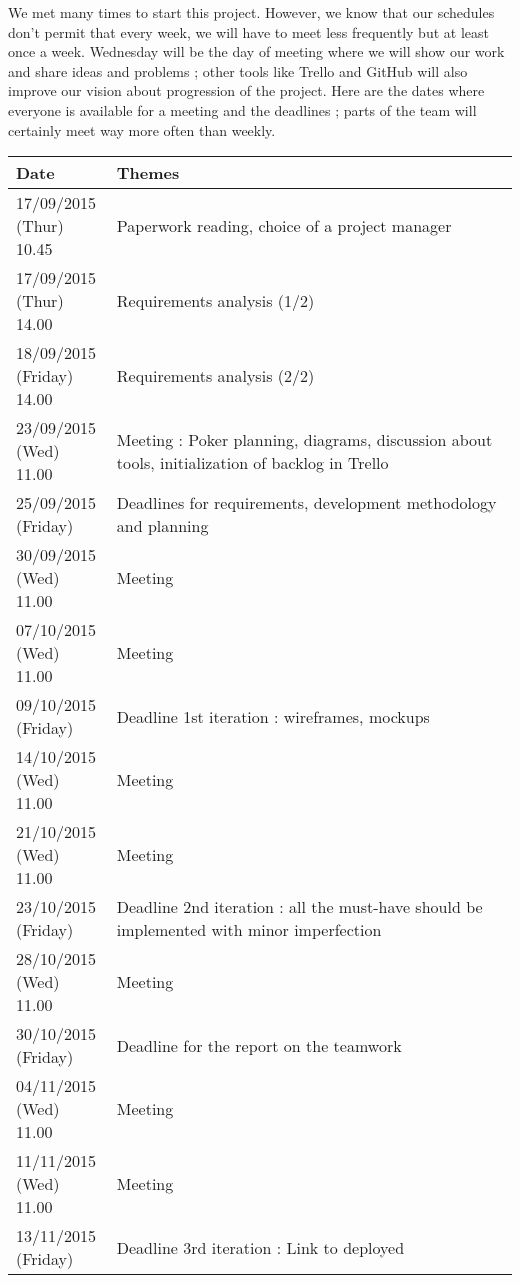 We met many times to start this project. However, we know that our
schedules don't permit that every week, we will have to meet less
frequently but at least once a week. Wednesday will be the day of
meeting where we will show our work and share ideas and problems ;
other tools like Trello and GitHub will also improve our vision about
progression of the project. Here are the dates where everyone is
available for a meeting and the deadlines ; parts of the team will
certainly meet way more often than weekly. \newline

\noindent\begin{longtable}{|p{0.2\linewidth}|p{0.8\linewidth}|}
    \hline
    Date & Themes \\
    \hline
    \hline
    17/09/2015 (Thur) 10.45 & Paperwork reading, choice of a project
    manager \\
    \hline
    17/09/2015 (Thur) 14.00 & Requirements analysis (1/2) \\
    \hline
    18/09/2015 (Friday) 14.00 & Requirements analysis (2/2) \\
    \hline
    23/09/2015 (Wed) 11.00 & Meeting : Poker planning, diagrams,
    discussion about tools, initialization of backlog in Trello \\
    \hline
    25/09/2015 (Friday) & Deadlines for requirements, development methodology
    and planning \\
    \hline
    30/09/2015 (Wed) 11.00 & Meeting \\
    \hline
    07/10/2015 (Wed) 11.00 & Meeting \\
    \hline
    09/10/2015 (Friday) & Deadline 1st iteration : wireframes, mockups \\
    \hline
    14/10/2015 (Wed) 11.00 & Meeting \\
    \hline
    21/10/2015 (Wed) 11.00 & Meeting \\
    \hline
    23/10/2015 (Friday) & Deadline 2nd iteration : all the must-have
    should be implemented with minor imperfection \\
    \hline
    28/10/2015 (Wed) 11.00 & Meeting \\
    \hline
    30/10/2015 (Friday) & Deadline for the report on the teamwork \\
    \hline
    04/11/2015 (Wed) 11.00 & Meeting \\
    \hline
    11/11/2015 (Wed) 11.00 & Meeting \\
    \hline
    13/11/2015 (Friday) & Deadline 3rd iteration : Link to deployed

\end{longtable}
